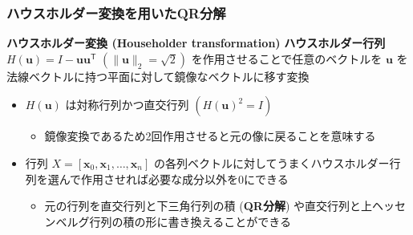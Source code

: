 \documentclass[dvipdfmx,aspectratio=169,20pt]{beamer}
\newcommand{\myfontsetting}[3]{{\fontsize{#1}{#2}\selectfont #3}}
\begin{document}
\begin{frame}
\frametitle{\myfontsetting{22pt}{22pt}{ハウスホルダー変換を用いたQR分解}}
\begin{block}{\myfontsetting{15pt}{15pt}{\bf ハウスホルダー変換 \myfontsetting{12pt}{12pt}{(Householder transformation)}}}
\myfontsetting{12pt}{12pt}{
 {\bf ハウスホルダー行列} $H(\bm{u}) = I - \bm{u}\bm{u}^\mathsf{T}$   \myfontsetting{10pt}{10pt}{ $(\|\bm{u}\|_2 = \sqrt{2})$} を作用させることで任意のベクトルを $\bm{u}$ を法線ベクトルに持つ平面に対して鏡像なベクトルに移す変換
}
\end{block}
\vspace{-2mm}
\begin{itemize}
        \item \myfontsetting{12pt}{12pt}{ 
            $H(\bm{u})$ は対称行列かつ直交行列 $(H(\bm{u})^2 = I)$
        }
        \begin{itemize}
            \item \myfontsetting{10pt}{10pt}{ 
            鏡像変換であるため2回作用させると元の像に戻ることを意味する
            }
        \end{itemize}
        
       \item \myfontsetting{12pt}{12pt}{
    行列 $X=[\bm{x}_0,\bm{x}_1,\dots, \bm{x}_n]$ の各列ベクトルに対してうまくハウスホルダー行列を選んで作用させれば必要な成分以外を0にできる
    }
    \begin{itemize}
        \item \myfontsetting{10pt}{10pt}{
    元の行列を直交行列と下三角行列の積 ({\bf QR分解}) や直交行列と上ヘッセンベルグ行列の積の形に書き換えることができる
    }
    \end{itemize}
\end{itemize}
\end{frame}
\end{document}
